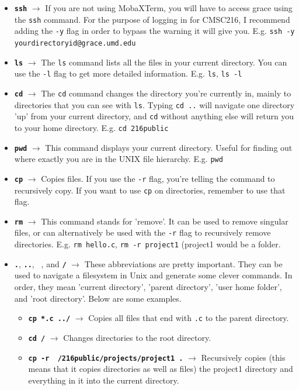 \documentclass[english, 10pt]{article}
\begin{document}
\begin{itemize}
	\item \textbf{\texttt{ssh}} $\rightarrow$ If you are not using MobaXTerm, you will have to access grace using the \texttt{ssh} command. For the purpose of logging in for CMSC216, I recommend adding the \texttt{-y} flag in order to bypass the warning it will give you. E.g. \texttt{ssh -y yourdirectoryid@grace.umd.edu}
	\item \textbf{\texttt{ls}} $\rightarrow$ The \texttt{ls} command lists all the files in your current directory. You can use the \texttt{-l} flag to get more detailed information. E.g. \texttt{ls}, \texttt{ls -l}
	\item \textbf{\texttt{cd}} $\rightarrow$ The \texttt{cd} command changes the directory you're currently in, mainly to directories that you can see with \texttt{ls}. Typing \texttt{cd ..} will navigate one directory 'up' from your current directory, and \texttt{cd} without anything else will return you to your home directory. E.g. \texttt{cd 216public}
	\item \textbf{\texttt{pwd}} $\rightarrow$ This command displays your current directory. Useful for finding out where exactly you are in the UNIX file hierarchy. E.g. \texttt{pwd}
	\item \textbf{\texttt{cp}} $\rightarrow$ Copies files. If you use the \texttt{-r} flag, you're telling the command to recursively copy. If you want to use \texttt{cp} on directories, remember to use that flag.
	\item \textbf{\texttt{rm}} $\rightarrow$ This command stands for 'remove'. It can be used to remove singular files, or can alternatively be used with the \texttt{-r} flag to recursively remove directories. E.g. \texttt{rm hello.c}, \texttt{rm -r project1} (project1 would be a folder.
	\item \textbf{\texttt{.}}, \textbf{\texttt{..}}, \textbf{\texttt{~}}, and \textbf{\texttt{/}} $\rightarrow$ These abbreviations are pretty important. They can be used to navigate a filesystem in Unix and generate some clever commands. In order, they mean 'current directory', 'parent directory', 'user home folder', and 'root directory'. Below are some examples.
	\begin{itemize}
		\item \textbf{\texttt{cp *.c ../}} $\rightarrow$ Copies all files that end with \texttt{.c} to the parent directory.
		\item \textbf{\texttt{cd /}} $\rightarrow$ Changes directories to the root directory.
		\item \textbf{\texttt{cp -r ~/216public/projects/project1 .}} $\rightarrow$ Recursively copies (this means that it copies directories as well as files) the project1 directory and everything in it into the current directory.
	\end{itemize}
\end{itemize}
\end{document}
